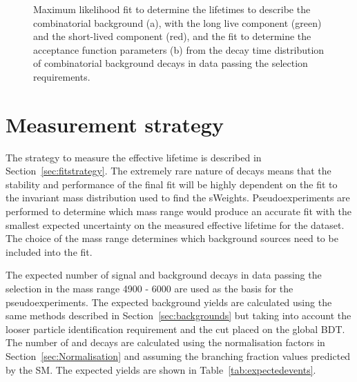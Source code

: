 \begin{figure}[tbp]
\begin{subfigure}[b]{0.48\textwidth}
   \end{subfigure}
    \caption{Maximum likelihood fit to determine the lifetimes to describe the combinatorial background (a), with the long live component (green) and the short-lived component (red), and the fit to determine the acceptance function parameters (b) from the decay time distribution of combinatorial background decays in data passing the \bhh selection requirements.}
    \label{fig:CBGaccpt}
\end{figure}



\section{Measurement strategy}%
\label{sec:toys}
The strategy to measure the \bsmumu effective lifetime is described in Section~\ref{sec:fitstrategy}. The extremely rare nature of \bsmumu decays means that the stability and performance of the final fit will be highly dependent on the fit to the invariant mass distribution used to find the sWeights. Pseudoexperiments are performed to determine which mass range would produce an accurate fit with the smallest expected uncertainty on the measured effective lifetime for the dataset. The choice of the mass range determines which background sources need to be included into the fit.


The expected number of signal and background decays in data passing the \bsmumu selection in the mass range 4900 - 6000 \mevcc are used as the basis for the pseudoexperiments. The expected background yields are calculated using the same methods described in Section~\ref{sec:backgrounds} but taking into account the looser particle identification requirement and the cut placed on the global BDT. The number of \bsmumu and \bdmumu decays are calculated using the normalisation factors in Section~\ref{sec:Normalisation} and assuming the branching fraction values predicted by the SM. The expected yields are shown in Table~\ref{tab:expectedevents}. 






